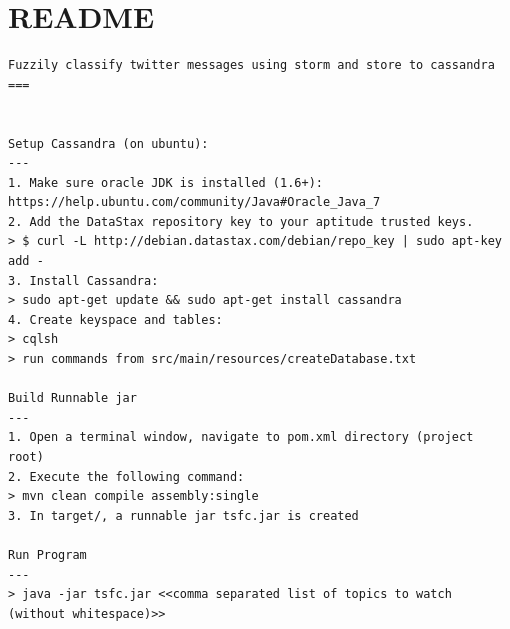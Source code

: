 \documentclass[a4paper]{article}
\begin{document}
\section{README}
\begin{lstlisting}
Fuzzily classify twitter messages using storm and store to cassandra
===


Setup Cassandra (on ubuntu):
---
1. Make sure oracle JDK is installed (1.6+): https://help.ubuntu.com/community/Java#Oracle_Java_7
2. Add the DataStax repository key to your aptitude trusted keys.
> $ curl -L http://debian.datastax.com/debian/repo_key | sudo apt-key add -
3. Install Cassandra:
> sudo apt-get update && sudo apt-get install cassandra
4. Create keyspace and tables:
> cqlsh
> run commands from src/main/resources/createDatabase.txt

Build Runnable jar
---
1. Open a terminal window, navigate to pom.xml directory (project root)
2. Execute the following command:
> mvn clean compile assembly:single
3. In target/, a runnable jar tsfc.jar is created

Run Program
---
> java -jar tsfc.jar <<comma separated list of topics to watch (without whitespace)>>
\end{lstlisting}
\end{document}
